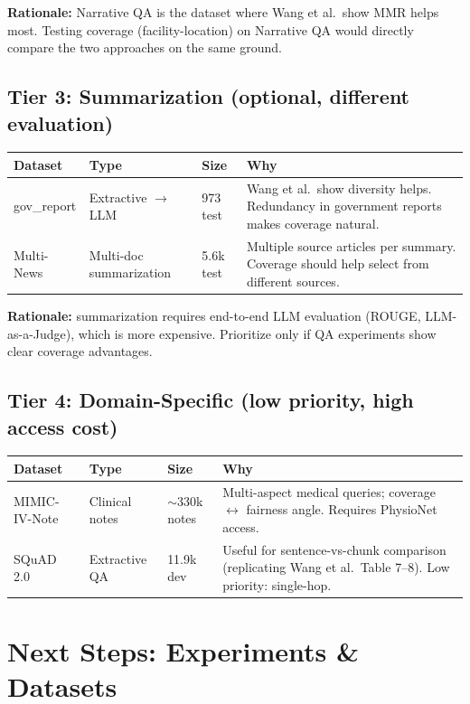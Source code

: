 \documentclass[11pt,a4paper]{article}
\begin{document}
\medskip
\noindent\textbf{Rationale:} Narrative QA is the dataset where Wang et al.\ show MMR helps most. Testing coverage (facility-location) on Narrative QA would directly compare the two approaches on the same ground.

\subsection{Tier 3: Summarization (optional, different evaluation)}

\begin{tabular}{@{}lp{3.5cm}p{2cm}p{5cm}@{}}
	\toprule
	Dataset & Type & Size & Why \\
	\midrule
	gov\_report & Extractive $\to$ LLM & 973 test & Wang et al.\ show diversity helps. Redundancy in government reports makes coverage natural. \\
	Multi-News & Multi-doc summarization & 5.6k test & Multiple source articles per summary. Coverage should help select from different sources. \\
	\bottomrule
\end{tabular}

\medskip
\noindent\textbf{Rationale:} summarization requires end-to-end LLM evaluation (ROUGE, LLM-as-a-Judge), which is more expensive. Prioritize only if QA experiments show clear coverage advantages.

\subsection{Tier 4: Domain-Specific (low priority, high access cost)}

\begin{tabular}{@{}lp{3.5cm}p{2cm}p{5cm}@{}}
	\toprule
	Dataset & Type & Size & Why \\
	\midrule
	MIMIC-IV-Note & Clinical notes & $\sim$330k notes & Multi-aspect medical queries; coverage $\leftrightarrow$ fairness angle. Requires PhysioNet access. \\
	SQuAD 2.0 & Extractive QA & 11.9k dev & Useful for sentence-vs-chunk comparison (replicating Wang et al.\ Table 7--8). Low priority: single-hop. \\
	\bottomrule
\end{tabular}

\section{Next Steps: Experiments \& Datasets}
\end{document}
